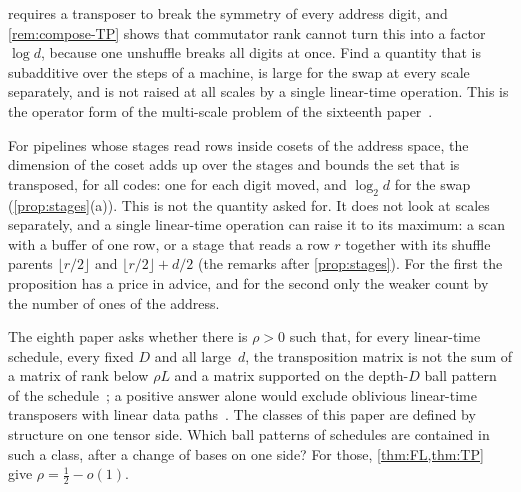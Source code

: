 \begin{problem}\label{prob:scales}
 requires a transposer to break the symmetry of every address digit, and \cref{rem:compose-TP} shows
that commutator rank cannot turn this into a factor $\log d$, because one unshuffle breaks all digits at once. Find a
quantity that is subadditive over the steps of a machine, is large for the swap at every scale separately, and is not
raised at all scales by a single linear-time operation. This is the operator form of the multi-scale problem of the
sixteenth paper~\cite[Problem~11.1]{SixteenthPaper2026}.
\end{problem}

For pipelines whose stages read rows inside cosets of the address space, the dimension of the coset adds up over
the stages and bounds the set that is transposed, for all codes: one for each digit moved, and $\log_2d$ for the
swap (\cref{prop:stages}(a)). This is not the quantity asked for. It does not look at scales separately, and a
single linear-time operation can raise it to its maximum: a scan with a buffer of one row, or a stage that reads a
row $r$ together with its shuffle parents $\lfloor r/2\rfloor$ and $\lfloor r/2\rfloor+d/2$ (the remarks after
\cref{prop:stages}). For the
first the proposition has a price in advice, and for the second only the weaker count by the number of ones of the
address.

\begin{problem}\label{prob:rigidity}
The eighth paper asks whether there is $\rho>0$ such that, for every linear-time schedule, every fixed $D$ and all
large~$d$, the transposition matrix is not the sum of a matrix of rank below $\rho L$ and a matrix supported on the
depth-$D$ ball pattern of the schedule~\cite[Problem~10.6]{EighthPaper2026}; a positive answer alone would exclude
oblivious linear-time transposers with linear data paths~\cite[Corollary~9.3]{BoundedStack2026}. The classes of this
paper are defined by structure on one tensor side. Which ball patterns of schedules are contained in such a class,
after a change of bases on one side? For those, \cref{thm:FL,thm:TP} give $\rho=\tfrac12-o(1)$.
\end{problem}
